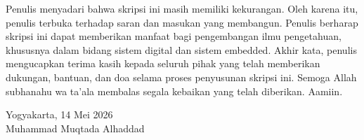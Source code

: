 Penulis menyadari bahwa skripsi ini masih memiliki kekurangan. Oleh karena itu,
penulis terbuka terhadap saran dan masukan yang membangun. Penulis berharap
skripsi ini dapat memberikan manfaat bagi pengembangan ilmu pengetahuan,
khususnya dalam bidang sistem digital dan sistem embedded. Akhir kata,
penulis mengucapkan terima kasih kepada seluruh pihak yang telah memberikan
dukungan, bantuan, dan doa selama proses penyusunan skripsi ini. Semoga Allah
subhanahu wa ta'ala membalas segala kebaikan yang telah diberikan. Aamiin.

\begin{flushright}
	Yogyakarta, 14 Mei 2026 \\
    \vspace{1.5cm}
    Muhammad Muqtada Alhaddad
\end{flushright}

